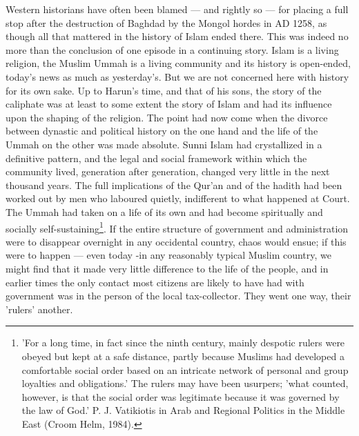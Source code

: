 \documentclass[11pt, b5paper, twoside]{book}
\begin{document}
Western historians have often been blamed --- and rightly so --- for placing a full stop after the 
destruction of Baghdad by the Mongol hordes in AD 1258, as though all that mattered in the history of 
Islam ended there. This was indeed no more than the conclusion of one episode in a continuing story. 
Islam is a living religion, the Muslim Ummah is a living community and its history is open-ended, 
today's news as much as yesterday's. But we are not concerned here with history for its own sake. Up 
to Harun's time, and that of his sons, the story of the caliphate was at least to some extent the 
story of Islam and had its influence upon the shaping of the religion. The point had now come when 
the divorce between dynastic and political history on the one hand and the life of the Ummah on the 
other was made absolute. Sunni Islam had crystallized in a definitive pattern, and the legal and 
social framework within which the community lived, generation after generation, changed very little 
in the next thousand years. The full implications of the Qur'an and of the hadith had been worked out 
by men who laboured quietly, indifferent to what happened at Court. The Ummah had taken on a life of 
its own and had become spiritually and socially self-sustaining\footnote{'For a long time, in fact since the ninth century, mainly despotic rulers were obeyed but kept at a safe distance, partly because Muslims had developed a comfortable social order based on an intricate network of personal and group loyalties and obligations.' The rulers may have been usurpers; 'what counted, however, is that the social order was legitimate because it was governed by the law of God.' P. J. Vatikiotis in Arab and Regional Politics in the Middle East (Croom Helm, 1984).}. If the entire structure of government and administration were to disappear overnight in any occidental country, chaos would ensue; if this were to happen --- even today -in any reasonably typical Muslim country, we might find that it made very little difference to the life of the people, and in earlier times the only contact most citizens are likely to have had with government was in the person of the local tax-collector. They went one way, their 'rulers' another. \\
\end{document}
